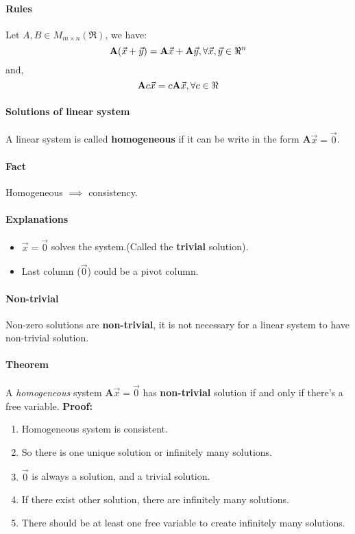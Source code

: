 \documentclass{article}
\begin{document}
	\paragraph{Rules} Let $A,B \in M_{m \times n}(\Re)$, we have:
	\[
	\text{\textbf{A}}(\vec{x} + \vec{y}) = \text{\textbf{A}}\vec{x} + \text{\textbf{A}}\vec{y}, \forall \vec{x},\vec{y} \in \Re^n
	\]
	and,
	\[
	\text{\textbf{A}} c \vec{x} = c \text{\textbf{A}} \vec{x}, \forall c \in \Re
	\]
	\paragraph{Solutions of linear system} A linear system is called \textbf{homogeneous} if it can be write in the form \textbf{A}$\vec{x} = \vec{0}$.
	\paragraph{Fact} Homogeneous $\implies$ consistency.
	\paragraph{Explanations}
	\begin{itemize}
		\item $\vec{x}=\vec{0}$ solves the system.(Called the \textbf{trivial} solution).
		\item Last column ($\vec{0}$) could be a pivot column.	
	\end{itemize}
	\paragraph{Non-trivial} Non-zero solutions are \textbf{non-trivial}, it is not necessary for a linear system to have non-trivial solution.
	\paragraph{Theorem} A \emph{homogeneous} system \textbf{A}$\vec{x}=\vec{0}$ has \textbf{non-trivial} solution if and only if there's a free variable.
	\newline \textbf{Proof:}
	\begin{enumerate}
		\item Homogeneous system is consistent.
		\item So there is one unique solution or infinitely many solutions.
		\item $\vec{0}$ is always a solution, and a trivial solution.
		\item If there exist other solution, there are infinitely many solutions.
		\item There should be at least one free variable to create infinitely many solutions.
	\end{enumerate}
\end{document}
